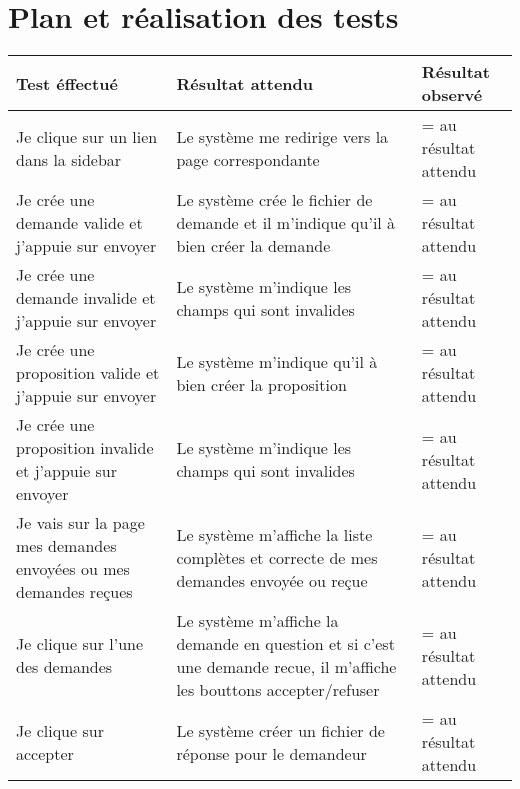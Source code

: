 \documentclass{article}
\begin{document}
\newpage


\section{Plan et réalisation des tests}

\begin{center}
    \begin{tabular}{|p{5cm}|p{5cm}|p{5cm}|}
      \hline
      \textbf{Test éffectué} & \textbf{Résultat attendu} & \textbf{Résultat observé} \\
      \hline

      Je clique sur un lien dans la sidebar&
      Le système me redirige vers la page correspondante&
      = au résultat attendu\\

      \hline
      \hline
      Je crée une demande valide et j'appuie sur envoyer&
      Le système crée le fichier de demande et il m'indique qu'il à bien créer la demande&
      = au résultat attendu\\

      \hline
      \hline
      Je crée une demande invalide et j'appuie sur envoyer&
      Le système m'indique les champs qui sont invalides&
      = au résultat attendu\\

      \hline
      \hline
      Je crée une proposition valide et j'appuie sur envoyer&
      Le système m'indique qu'il à bien créer la proposition&
      = au résultat attendu\\

      \hline
      \hline
      Je crée une proposition invalide et j'appuie sur envoyer&
      Le système m'indique les champs qui sont invalides&
      = au résultat attendu\\

      \hline
      \hline
      Je vais sur la page mes demandes envoyées ou mes demandes reçues&
      Le système m'affiche la liste complètes et correcte de mes demandes envoyée ou reçue&
      = au résultat attendu\\

      \hline
      \hline
      Je clique sur l'une des demandes&
      Le système m'affiche la demande en question et si c'est une demande recue, il m'affiche les bouttons accepter/refuser&
      = au résultat attendu\\

      \hline
      \hline
      Je clique sur accepter&
      Le système créer un fichier de réponse pour le demandeur&
      = au résultat attendu\\


\end{tabular}
\end{center}
\end{document}
